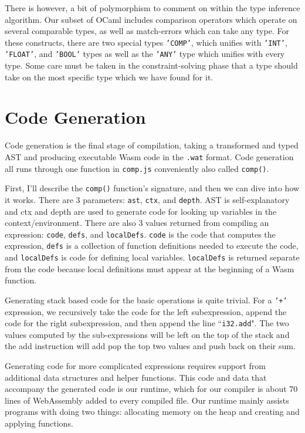 \documentclass[12pt,a4paper,twoside,openright]{report}
\begin{document}
There is however, a bit of polymorphism to comment on within the type inference algorithm.
Our subset of OCaml includes comparison operators which operate on several comparable types, as well as match-errors which can take any type.
For these constructs, there are two special types {\tt 'COMP'}, which unifies with {\tt 'INT'}, {\tt 'FLOAT'}, and {\tt 'BOOL'} types as well as the {\tt 'ANY'} type which unifies with every type.
Some care must be taken in the constraint-solving phase that a type should take on the most specific type which we have found for it.

\section{Code Generation}
Code generation is the final stage of compilation, taking a transformed and typed AST and producing executable Wasm code in the {\tt .wat} format.
Code generation all runs through one function in {\tt comp.js} conveniently also called {\tt comp()}.

First, I'll describe the {\tt comp()} function's signature, and then we can dive into how it works.
There are 3 parameters: {\tt ast}, {\tt ctx}, and {\tt depth}.
AST is self-explanatory and ctx and depth are used to generate code for looking up variables in the context/environment.
There are also 3 values returned from compiling an expression: {\tt code}, {\tt defs}, and {\tt localDefs}.
{\tt code} is the code that computes the expression, {\tt defs} is a collection of function definitions needed to execute the code, and {\tt localDefs} is code for defining local variables.
{\tt localDefs} is returned separate from the code because local definitions must appear at the beginning of a Wasm function.

Generating stack based code for the basic operations is quite trivial.
For a {\tt '+'} expression, we recursively take the code for the left subexpression, append the code for the right subexpression, and then append the line ``{\tt  i32.add}".
The two values computed by the sub-expressions will be left on the top of the stack and the add instruction will add pop the top two values and push back on their sum.

Generating code for more complicated expressions requires support from additional data structures and helper functions.
This code and data that accompany the generated code is our runtime, which for our compiler is about 70 lines of WebAssembly added to every compiled file.
Our runtime mainly assists programs with doing two things: allocating memory on the heap and creating and applying functions.
\end{document}
